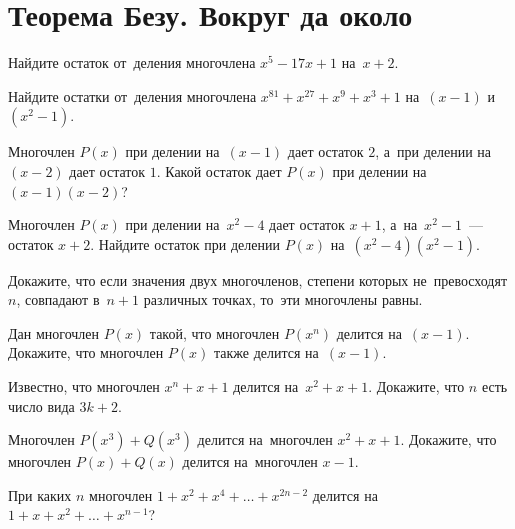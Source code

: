 
\section*{Теорема Безу. Вокруг да около}


\begin{problems}

\item
Найдите остаток от~деления многочлена $x^5 - 17 x + 1$ на~$x + 2$.

\item
Найдите остатки от~деления многочлена $x^{81} + x^{27} + x^9 + x^3 + 1$
на~$(x - 1)$ и~$(x^2 - 1)$.

\item
Многочлен $P(x)$ при делении на~$(x - 1)$ дает остаток $2$, а~при делении
на~$(x - 2)$ дает остаток $1$.
Какой остаток дает $P(x)$ при делении на~$(x - 1) (x - 2)$?

\item
Многочлен $P(x)$ при делении на~$x^2 - 4$ дает остаток $x + 1$,
а~на~$x^2 - 1$~--- остаток $x + 2$.
Найдите остаток при делении $P(x)$ на~$(x^2 - 4) (x^2 - 1)$.

\item
Докажите, что если значения двух многочленов, степени которых
не~превосходят $n$, совпадают в~$n + 1$ различных точках, то~эти многочлены
равны.

\item
Дан многочлен $P(x)$ такой, что многочлен $P(x^n)$ делится на~$(x - 1)$.
Докажите, что многочлен $P(x)$ также делится на~$(x - 1)$.

\item
Известно, что многочлен $x^n + x + 1$ делится на~$x^2 + x + 1$.
Докажите, что $n$ есть число вида $3 k + 2$.

\item
Многочлен $P(x^3) + Q(x^3)$ делится на~многочлен $x^2 + x + 1$.
Докажите, что многочлен $P(x) + Q(x)$ делится на~многочлен $x - 1$.

\item
При каких $n$ многочлен $1 + x^2 + x^4 + \ldots + x^{2n-2}$ делится
на~$1 + x + x^2 + \ldots + x^{n-1}$?

\end{problems}

